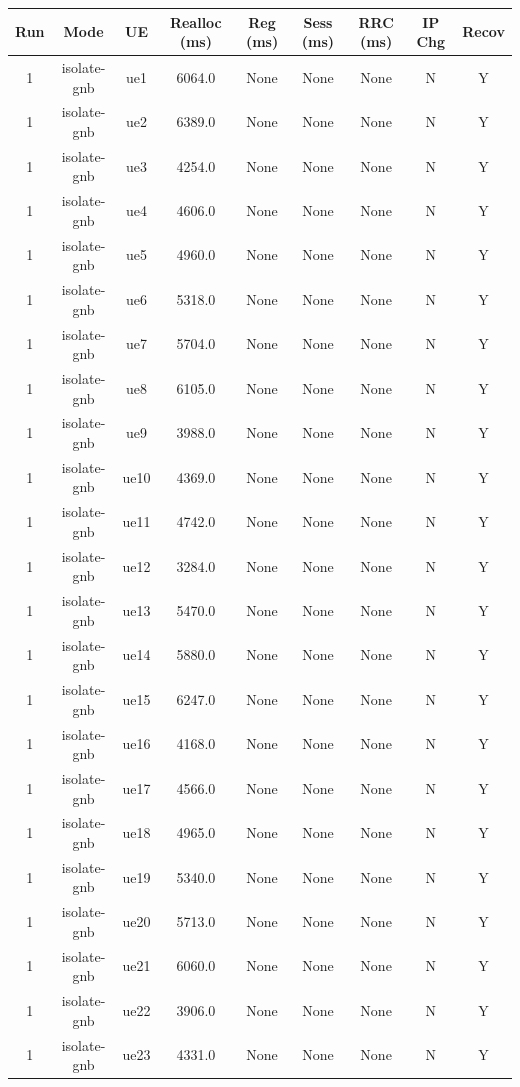 \begin{table}[ht]
\centering
\begin{tabular}{|c|c|c|c|c|c|c|c|c|}
\hline
Run & Mode & UE & Realloc (ms) & Reg (ms) & Sess (ms) & RRC (ms) & IP Chg & Recov \\
\hline
1 & isolate-gnb & ue1 & 6064.0 & None & None & None & N & Y \\
1 & isolate-gnb & ue2 & 6389.0 & None & None & None & N & Y \\
1 & isolate-gnb & ue3 & 4254.0 & None & None & None & N & Y \\
1 & isolate-gnb & ue4 & 4606.0 & None & None & None & N & Y \\
1 & isolate-gnb & ue5 & 4960.0 & None & None & None & N & Y \\
1 & isolate-gnb & ue6 & 5318.0 & None & None & None & N & Y \\
1 & isolate-gnb & ue7 & 5704.0 & None & None & None & N & Y \\
1 & isolate-gnb & ue8 & 6105.0 & None & None & None & N & Y \\
1 & isolate-gnb & ue9 & 3988.0 & None & None & None & N & Y \\
1 & isolate-gnb & ue10 & 4369.0 & None & None & None & N & Y \\
1 & isolate-gnb & ue11 & 4742.0 & None & None & None & N & Y \\
1 & isolate-gnb & ue12 & 3284.0 & None & None & None & N & Y \\
1 & isolate-gnb & ue13 & 5470.0 & None & None & None & N & Y \\
1 & isolate-gnb & ue14 & 5880.0 & None & None & None & N & Y \\
1 & isolate-gnb & ue15 & 6247.0 & None & None & None & N & Y \\
1 & isolate-gnb & ue16 & 4168.0 & None & None & None & N & Y \\
1 & isolate-gnb & ue17 & 4566.0 & None & None & None & N & Y \\
1 & isolate-gnb & ue18 & 4965.0 & None & None & None & N & Y \\
1 & isolate-gnb & ue19 & 5340.0 & None & None & None & N & Y \\
1 & isolate-gnb & ue20 & 5713.0 & None & None & None & N & Y \\
1 & isolate-gnb & ue21 & 6060.0 & None & None & None & N & Y \\
1 & isolate-gnb & ue22 & 3906.0 & None & None & None & N & Y \\
1 & isolate-gnb & ue23 & 4331.0 & None & None & None & N & Y \\

\end{tabular}
\end{table}
